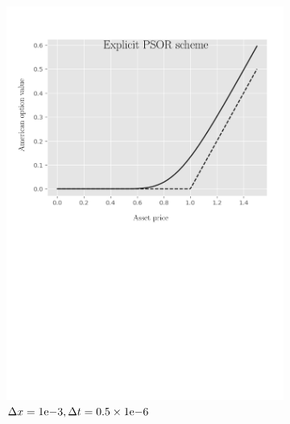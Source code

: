 \begin{figure}[H]
\begin{subfigure}{0.4\textwidth}
    \includegraphics[width=\textwidth]{chapters/chapter5/TestCase1ExplicitLCP.pdf}
    \caption{$\Delta{x}={1}\mathrm{e}{-3}, \Delta{t}=0.5\times{1}\mathrm{e}{-6}$}
    \label{fig:lcp:numericaresults:test_case_1_explicit}
  \end{subfigure}
  \begin{subfigure}{0.4\textwidth}
    \centering

\end{subfigure}
\end{figure}
